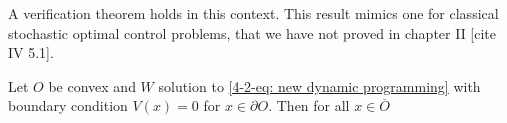 A verification theorem holds in this context. This result mimics one for classical stochastic optimal control problems, that we have not proved in chapter II [cite IV 5.1].

\begin{theorem}
    Let $O$ be convex and $W$ solution to \eqref{4-2-eq: new dynamic programming} with boundary condition $V(x)=0$ for $x\in\partial O$. Then for all $x\in\overline{O}$ 
\end{theorem}